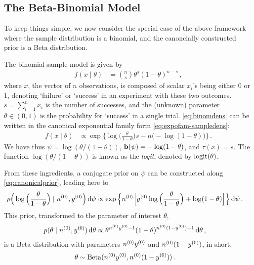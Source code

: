 \subsection{The Beta-Binomial Model}
\label{sec:beta-binom}

To keep things simple, we now consider the special case of the above framework
where the sample distribution is a binomial, and the canoncially constructed prior is a Beta distribution.

The binomial sample model is given by
\begin{align}
\label{eq:binomdens}
f(x\mid\theta) &= {n \choose s}\theta^s (1-\theta)^{n-s}\,,
\end{align}
where $x$, the vector of $n$ observations, is composed of scalar $x_i$'s being either $0$ or $1$,
denoting `failure' or `success' in an experiment with these two outcomes.
$s = \sum_{i=1}^n x_i$ is the number of successes,
and the (unknown) parameter $\theta \in (0,1)$ is the probability for `success' in a single trial.
\eqref{eq:binomdens} can be written in the canonical exponential family form \eqref{eq:expofam-sampledens}:
\begin{align*}
f(x\mid\theta) &\propto \exp\Big\{ \log\Big(\frac{\theta}{1-\theta}\Big) s - n \big(-\log(1-\theta)\big) \Big\} \,.
\end{align*}
We have thus $\psi = \log(\theta/(1-\theta))$, $\mathbf{b}(\psi) = -\log(1-\theta)$, and $\tau(x) = s$.
The function $\log(\theta/(1-\theta))$ is known as the \emph{logit}, denoted by $\operatorname{logit}(\theta)$.

From these ingredients, a conjugate prior on $\psi$ can be constructed along \eqref{eq:canonicalprior},
leading here to
\begin{align*}
p\Big(\log\Big(\frac{\theta}{1-\theta}\Big) \mid \nz, \yz\Big) \dd\psi %
 &\propto \exp\Big\{ \nz \Big[ \yz \log\Big(\frac{\theta}{1-\theta}\Big) + \log(1-\theta) \Big] \Big\} \dd\psi\,.
\end{align*}
This prior, transformed to the parameter of interest $\theta$,
\begin{align*}
p(\theta\mid n^{(0)}, y^{(0)})\,\mathrm{d}\theta &\propto \theta^{n^{(0)}y^{(0)} - 1} (1-\theta)^{n^{(0)}(1-y^{(0)}) - 1} \,\mathrm{d}\theta\,,
\end{align*}
is a Beta distribution with parameters $n^{(0)}y^{(0)}$ and $n^{(0)}(1-y^{(0)})$, in short, %
\begin{align*}
\theta &\sim \operatorname{Beta}(n^{(0)}y^{(0)}, n^{(0)}(1-y^{(0)}))\,.
\end{align*}

